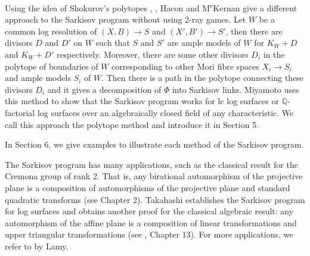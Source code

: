 Using the idea of Shokurov's polytopes \cite{Sho96}, \cite{cs11}, Hacon and M\textsuperscript{c}Kernan \cite{haconSarkisovProgram2012} give a different approach to the Sarkisov program without using 2-ray games.
Let $W$ be a common log resolution of $(X,B)\to S$ and $(X',B')\to S'$, then there are divisors $D$ and $D'$ on $W$ such that $S$ and $S'$ are ample models of $W$ for $K_W+D$ and $K_W+D'$ respectively. 
Moreover, there are some other divisors $D_i$ in the polytope of boundaries of $W$ corresponding to other Mori fibre spaces $X_i\to S_i$ and ample models $S_i$ of $W$. Then there is a path in the polytope connecting these divisors $D_i$ and it gives a decomposition of $\Phi$ into Sarkisov links.
Miyamoto \cite{miyamoto2019TheSP} uses this method to show that the Sarkisov program works for lc log surfaces or $\mathbb{Q}$-factorial log surfaces over an algebraically closed field of any characteristic. 
We call this approach the polytope method and introduce it in Section 5. 

In Section 6, we give examples to illustrate each method of the Sarkisov program.

The Sarkisov program has many applications, such as the classical result for the Cremona group of rank 2. That is, any birational automorphism of the projective plane is a composition of automorphisms of the projective plane and standard quadratic transforms (see \cite{ksc04} Chapter 2). Takahashi \cite{tak95} establishes the Sarkisov program for log surfaces and obtains another proof for the classical algebraic result: any automorphism of the affine plane is a composition of linear transformations and upper triangular transformations (see \cite{mat02}, Chapter 13). For more applications, we refer to \cite{lam22} by Lamy.

